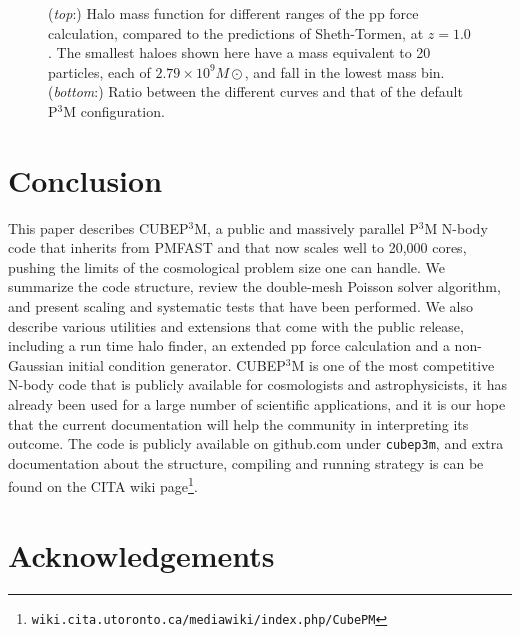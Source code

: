 \documentclass[useAMS,usenatbib]{mn2e}
\begin{document}
\begin{figure}
  \begin{center}
  \caption{ ({\it top}:) Halo mass function for different ranges of the pp force calculation, compared to the predictions of Sheth-Tormen, at $z = 1.0$. 
  The smallest haloes shown here have a mass equivalent to 20 particles, each of $2.79 \times 10^{9} M{\odot}$, and fall in the lowest mass bin.
  ({\it bottom}:) Ratio between the different curves and that of the default P$^3$M configuration.}
    \label{fig:MassFunction_extpp}
  \end{center}
\end{figure}


%

\section{Conclusion}

This paper describes {\small CUBEP$^3$M}, a public and  massively parallel P$^3$M N-body code that inherits from {\small PMFAST} 
 and that now scales well to 20,000 cores, pushing the limits of the cosmological problem size one can handle.
We summarize the code structure, review the double-mesh Poisson solver algorithm, and present scaling and systematic tests
that have been performed. We also describe various utilities and extensions that come with the public release, 
including a run time halo finder, an extended pp force calculation and a non-Gaussian initial condition generator.
{\small CUBEP$^3$M} is one of the most competitive N-body code that is publicly available for cosmologists and astrophysicists,
it has already been used  for a large number of scientific applications, and it is our hope that the current documentation will 
help the community in interpreting its outcome.
The code is publicly available on github.com under {\tt cubep3m}, and extra documentation about the structure, 
compiling and running strategy is can be found on the CITA wiki page\footnote{\tt wiki.cita.utoronto.ca/mediawiki/index.php/CubePM}.

\section*{Acknowledgements}
\end{document}
